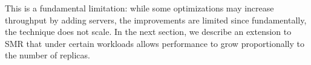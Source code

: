 
This is a fundamental limitation: while some optimizations may increase throughput by adding servers, the improvements are limited since fundamentally, the technique does not scale.
In the next section, we describe an extension to SMR that under certain workloads allows performance to grow proportionally to the number of replicas.





